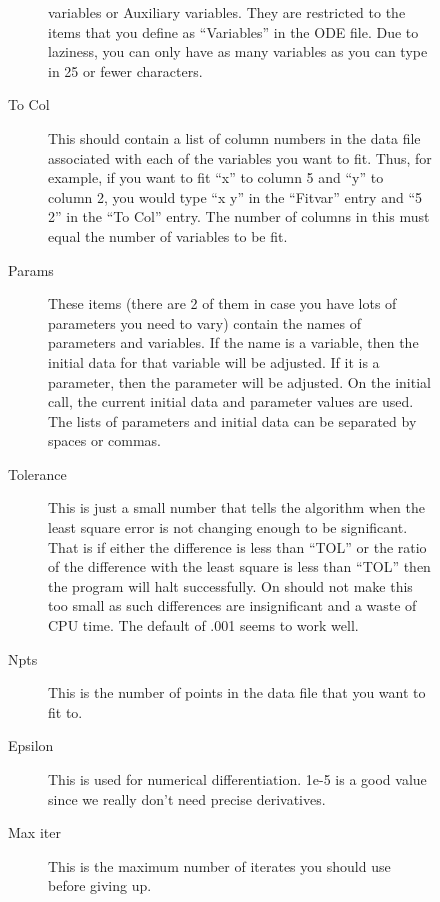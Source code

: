 \documentclass{article}
\begin{document}
\begin{description}
\begin{description}
\begin{description}
variables or Auxiliary variables.  They are restricted to the items
that you define as ``Variables'' in the ODE file.  Due to laziness,
you can only have as many variables as you can type in 25 or fewer
characters.  
	\item[To Col]  This should contain a list of column numbers in
the data file associated with each of the variables you want to
fit. Thus, for example, if you want to fit ``x'' to column 5 and ``y''
to column 2, you would type ``x y'' in the ``Fitvar'' entry and ``5
2'' in the ``To Col'' entry. The number of columns in this must equal
the number of variables to be fit.
\item [Params]  These items (there are 2 of them in case you have lots
of parameters you need to vary) contain the names of parameters and
variables.  If the name is a variable, then the initial data for that
variable will be adjusted.  If it is a parameter, then the parameter
will be adjusted.  On the initial call, the current initial data and
parameter values are used. The lists of parameters and initial data
can be separated by spaces or commas.  
\item [Tolerance]  This is just a small number that tells the
algorithm when the least square error is not changing enough to be
significant.  That is if either the difference is less than ``TOL'' or
the ratio of the difference with the least square is less than ``TOL''
then the program will halt successfully.  On should not make this too
small as such differences are insignificant and a waste of CPU time.
The default of .001 seems to work well.
\item [Npts]  This is the number of points in the data file that you
want to fit to.  
\item [Epsilon]  This is used for numerical differentiation.  1e-5 is
a good value since we really don't need precise derivatives.
\item [Max iter] This is the maximum number of iterates you should use
before giving up.  
\end{description} 


\end{description}
\end{description}
\end{document}
